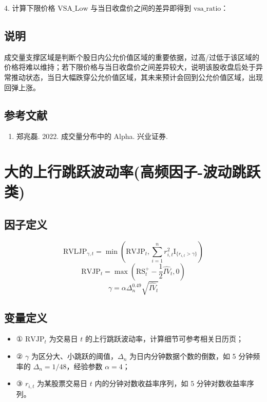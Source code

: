 \documentclass{article}
\begin{document}
4. 计算下限价格 \( \mathrm{VSA\_Low} \) 与当日收盘价之间的差异即得到 \( \mathrm{vsa\_ratio} \)：

\subsection{说明}
成交量支撑区域是判断个股日内公允价值区域的重要依据，过高/过低于该区域的价格将难以维持；若下限价格与当日收盘价之间差异较大，说明该股收盘后处于异常推动状态，当日大幅跌穿公允价值区域，其未来预计会回到公允价值区域，出现回弹上涨。

\subsection{参考文献}
\begin{enumerate}
    \item 郑兆磊. 2022. 成交量分布中的 Alpha. 兴业证券.
\end{enumerate}

\section{大的上行跳跃波动率(高频因子-波动跳跃类)}

\subsection{因子定义}
\begin{equation}
    \mathrm{RVLJP}_{\gamma,t} = \min\left(\mathrm{RVJP}_t, \sum_{i=1}^n r_{i,t}^2 \mathrm{I}_{\{r_{i,t} > \gamma\}}\right)
\end{equation}
\begin{equation}
    \mathrm{RVJP}_t = \max\left(\mathrm{RS}_t^+ - \frac{1}{2} \hat{IV}_t, 0\right)
\end{equation}
\begin{equation}
    \gamma = \alpha \Delta_n^{0.49} \sqrt{\hat{IV}_t}
\end{equation}

\subsection{变量定义}
\begin{itemize}
    \item ① \( \mathrm{RVJP}_t \) 为交易日 \( t \) 的上行跳跃波动率，计算细节可参考相关日历页；
    \item ② \( \gamma \) 为区分大、小跳跃的阈值，\( \Delta_n \) 为日内分钟数据个数的倒数，如 5 分钟频率的 \( \Delta_n = 1/48 \)，经验参数 \( \alpha = 4 \)；
    \item ③ \( r_{i,t} \) 为某股票交易日 \( t \) 内的分钟对数收益率序列，如 5 分钟对数收益率序列。
\end{itemize}
\end{document}
